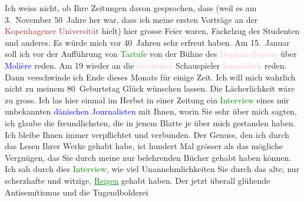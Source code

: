            \pstart
           Ich weiss nicht, ob Ihre Zeitungen davon gesprochen, dass (weil es am
                  3. November 50 Jahre her war, dass ich meine ersten Vorträge an der
                  \textcolor{brown}{Kopenhagener Universität}{}\ledrightnote{\textcolor{brown}{Københavns Universitet}} hielt) hier grosse Feier
               waren, Fackelzug der Studenten {\pb}und anderes. Es würde mich vor 40 Jahren sehr erfreut haben.\pend
           \pstart
           Am 15. Januar soll ich vor der Aufführung von \textcolor{green}{Tartufe}{}\ledrightnote{\textcolor{green}{Tartuffe}} von der Bühne des \textcolor{pink}{Dagmar-Teaters}{}\ledrightnote{\textcolor{pink}{Dagmar Teatret}} über \textcolor{blue}{Molière}{}\ledrightnote{\textcolor{blue}{Molière}} reden. Am
                  19 wieder an die \textcolor{pink}{russischen}{}\ledrightnote{\textcolor{pink}{Russland}}
               Schauspieler \textcolor{pink}{französisch}{}\ledrightnote{\textcolor{pink}{Frankreich}} reden.\pend
           \pstart
           Dann verschwinde ich Ende dieses Monats für einige Zeit. Ich will mich wahrlich nicht
               zu meinem 80 Geburtstag Glück wünschen lassen. Die Lächerlichkeit wäre zu gross.\pend
           \pstart
           Ich las hier einmal im Herbst in einer Zeitung ein
               \textcolor{green}{Interview}{} eines mir
               unbekannten { }\textcolor{blue}{dänischen Journalisten}{} mit
               Ihnen, worin Sie sehr \label{K_L02373-1v}\label{K_L02373-1h} über mich
               sagten, ich glaube die freundlichsten, die in jenem Blatte je über mich gestanden
               haben.\pend
           \pstart
           Ich bleibe Ihnen immer verpflichtet und {\pb}verbunden. Der Genuss, den ich
               durch das Lesen Ihrer Werke gehabt habe, ist hundert Mal grösser als das mögliche
               Vergnügen, das Sie durch meine nur belehrenden Bücher gehabt haben können.\pend
           \pstart
           Ich sah durch dies \textcolor{green}{Interview}{}, wie
               viel Unannehmlichkeiten Sie durch das alte, nur scherzhafte und witzige, \textcolor{green}{\uline{Reigen}}{}\ledrightnote{\textcolor{green}{Reigen. Zehn Dialoge}} gehabt haben. Der jetzt überall glühende Antisemitismus und die Tugendbolderei
